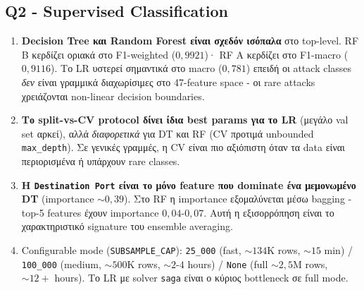 \documentclass[12pt,a4paper,twoside]{book}
\begin{document}
\subsection{Q2 - Supervised Classification}
\begin{enumerate}
    \item \textbf{Decision Tree και Random Forest είναι σχεδόν ισόπαλα}
    στο top-level. RF B κερδίζει οριακά στο F1-weighted (\(0{,}9921\))·
    RF A κερδίζει στο F1-macro (\(0{,}9116\)). Το LR υστερεί σημαντικά
    στο macro (\(0{,}781\)) επειδή οι attack classes \emph{δεν} είναι
    γραμμικά διαχωρίσιμες στο 47-feature space - οι rare attacks
    χρειάζονται non-linear decision boundaries.
    \item \textbf{Το split-vs-CV protocol δίνει ίδια best params για το
    LR} (μεγάλο val set αρκεί), αλλά \emph{διαφορετικά} για DT και RF
    (CV προτιμά unbounded \texttt{max\_depth}). Σε γενικές γραμμές, η
    CV είναι πιο αξιόπιστη όταν τα data είναι περιορισμένα ή υπάρχουν
    rare classes.
    \item \textbf{Η \texttt{Destination Port} είναι το μόνο feature
    που dominate ένα μεμονωμένο DT} (importance \(\sim 0{,}39\)). Στο
    RF η importance εξομαλύνεται μέσω bagging - top-5 features έχουν
    importance \(0{,}04\)-\(0{,}07\). Αυτή η εξισορρόπηση είναι το
    χαρακτηριστικό signature του ensemble averaging.
    \item Configurable mode (\texttt{SUBSAMPLE\_CAP}): \texttt{25\_000}
    (fast, \(\sim 134\)K rows, \(\sim 15\) min) / \texttt{100\_000}
    (medium, \(\sim 500\)K rows, \(\sim 2\)-\(4\) hours) / \texttt{None}
    (full \(\sim 2{,}5\)M rows, \(\sim 12+\) hours). Το LR με solver
    \texttt{saga} είναι ο κύριος bottleneck σε full mode.
\end{enumerate}
\end{document}

